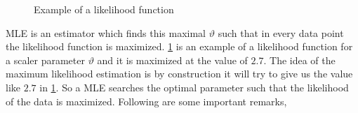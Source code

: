 \documentclass[ 11pt,%
				a4paper,%
				twoside,%
				headinclude,%
				footinclude = true,%
				cleardoublepage = empty,%
				reqno]{scrbook}
\begin{document}
\begin{figure}[H]
\centering
{}
\caption{Example of a likelihood function}\label{fig:likelihoodfunction}
\end{figure}


MLE is an estimator which finds this maximal $\vartheta$ such that in every data point the likelihood function is maximized. \cref{fig:likelihoodfunction} is an example of a likelihood function for a scaler parameter $\vartheta$ and it is maximized at the value of $2.7$. The idea of the maximum likelihood estimation is by construction it will try to give us the value like $2.7$ in \cref{fig:likelihoodfunction}. So a MLE searches the optimal parameter such that the likelihood of the data is maximized. Following are some important remarks,
\end{document}
